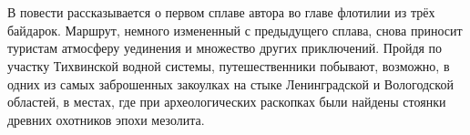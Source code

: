 \chapter*{}

В повести рассказывается о первом сплаве автора во главе флотилии из трёх байдарок. Маршрут, немного измененный с предыдущего сплава, снова приносит туристам атмосферу уединения и множество других приключений. Пройдя по участку Тихвинской водной системы, путешественники побывают, возможно, в одних из самых заброшенных закоулках на стыке Ленинградской и Вологодской областей, в местах, где при археологических раскопках были найдены стоянки древних охотников эпохи мезолита.

